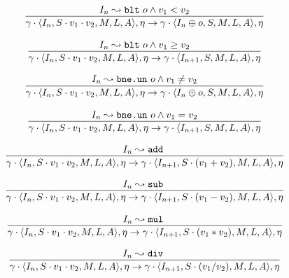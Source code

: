 \documentclass[declaration,shortabstract,english,mgr]{iithesis}
\newcommand{\mstate}[5] {
	\langle#1, #2, #3, #4, #5\rangle
}
\newcommand{\ipointsto}[3] {
	#1 \leadsto \texttt{#2} \text{ } #3
}
\begin{document}
\begin{equation}
\label{eq:semantics_blt1}
	\infer{
		\gamma \cdot \mstate{I_n}{S \cdot v_1 \cdot v_2}{M}{L}{A}, \eta
			\rightarrow
		\gamma \cdot \mstate{I_{n} \oplus o}{S}{M}{L}{A}, \eta
	}
	{\ipointsto{I_n}{blt}{o} \land v_1 < v_2}
\end{equation}

\begin{equation}
\label{eq:semantics_blt2}
	\infer{
		\gamma \cdot \mstate{I_n}{S \cdot v_1 \cdot v_2}{M}{L}{A}, \eta
			\rightarrow
		\gamma \cdot \mstate{I_{n+1}}{S}{M}{L}{A}, \eta
	}
	{\ipointsto{I_n}{blt}{o} \land v_1 \geq v_2}
\end{equation}

\begin{equation}
\label{eq:semantics_bneun1}
	\infer{
		\gamma \cdot \mstate{I_n}{S \cdot v_1 \cdot v_2}{M}{L}{A}, \eta
			\rightarrow
		\gamma \cdot \mstate{I_{n} \oplus o}{S}{M}{L}{A}, \eta
	}
	{\ipointsto{I_n}{bne.un}{o} \land v_1 \neq v_2}
\end{equation}

\begin{equation}
\label{eq:semantics_bneun2}
	\infer{
		\gamma \cdot \mstate{I_n}{S \cdot v_1 \cdot v_2}{M}{L}{A}, \eta
			\rightarrow
		\gamma \cdot \mstate{I_{n+1}}{S}{M}{L}{A}, \eta
	}
	{\ipointsto{I_n}{bne.un}{o} \land v_1 = v_2}
\end{equation}

\begin{equation}
\label{eq:semantics_add}
	\infer{
		\gamma \cdot \mstate{I_n}{S \cdot v_1 \cdot v_2}{M}{L}{A}, \eta
			\rightarrow
		\gamma \cdot \mstate{I_{n+1}}{S \cdot (v_1 + v_2)}{M}{L}{A}, \eta		
	}
	{\ipointsto{I_n}{add}}
\end{equation}

\begin{equation}
\label{eq:semantics_sub}
	\infer{
		\gamma \cdot \mstate{I_n}{S \cdot v_1 \cdot v_2}{M}{L}{A}, \eta
			\rightarrow
		\gamma \cdot \mstate{I_{n+1}}{S \cdot (v_1 - v_2)}{M}{L}{A}, \eta		
	}
	{\ipointsto{I_n}{sub}}
\end{equation}

\begin{equation}
\label{eq:semantics_mul}
	\infer{
		\gamma \cdot \mstate{I_n}{S \cdot v_1 \cdot v_2}{M}{L}{A}, \eta
			\rightarrow
		\gamma \cdot \mstate{I_{n+1}}{S \cdot (v_1 * v_2)}{M}{L}{A}, \eta		
	}
	{\ipointsto{I_n}{mul}}
\end{equation}

\begin{equation}
\label{eq:semantics_div}
	\infer{
		\gamma \cdot \mstate{I_n}{S \cdot v_1 \cdot v_2}{M}{L}{A}, \eta
			\rightarrow
		\gamma \cdot \mstate{I_{n+1}}{S \cdot (v_1 / v_2)}{M}{L}{A}, \eta		
	}
	{\ipointsto{I_n}{div}}
\end{equation}
\end{document}
